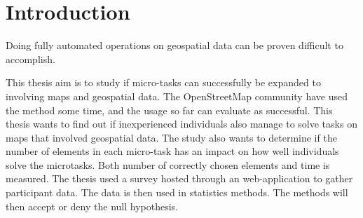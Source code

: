 \chapter{Introduction}

Doing fully automated operations on geospatial data can be proven difficult to accomplish. 

This thesis aim is to study if micro-tasks can successfully be expanded to involving maps and geospatial data. The OpenStreetMap community have used the method some time, and the usage so far can evaluate as successful. This thesis wants to find out if inexperienced individuals also manage to solve tasks on maps that involved geospatial data. The study also wants to determine if the number of elements in each micro-task has an impact on how well individuals solve the microtasks. Both number of correctly chosen elements and time is measured. The thesis used a survey hosted through an web-application to gather participant data. The data is then used in statistics methods. The methods will then accept or deny the null hypothesis. 
